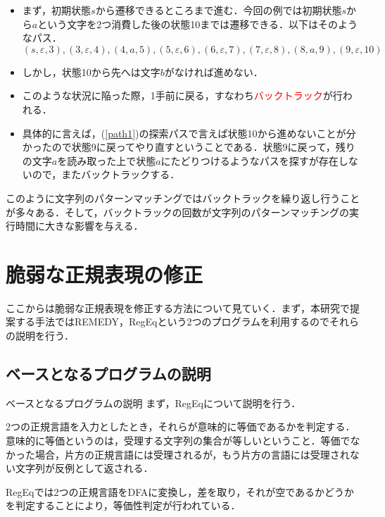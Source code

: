 \documentclass[uplatex,dvipdfmx,11pt,notheorems,aspectratio = 169]{beamer}
\theoremstyle{definition}
\begin{document}
\begin{frame}
  \begin{itemize}
    \item まず，初期状態$s$から遷移できるところまで進む．今回の例では初期状態$s$から$a$という文字を2つ消費した後の状態10までは遷移できる．以下はそのようなパス．
    \begin{equation}
      (s,\varepsilon,3),(3,\varepsilon,4),(4,a,5),(5,\varepsilon,6),(6,\varepsilon,7),(7,\varepsilon,8),(8,a,9),(9,\varepsilon,10)\label{path1}
    \end{equation}
    \item しかし，状態10から先へは文字$b$がなければ進めない．
    \item このような状況に陥った際，1手前に戻る，すなわち\textcolor{red}{バックトラック}が行われる．
    \item 具体的に言えば，(\ref{path1})の探索パスで言えば状態10から進めないことが分かったので状態9に戻ってやり直すということである．状態9に戻って，残りの文字$a$を読み取った上で状態$a$にたどりつけるようなパスを探すが存在しないので，またバックトラックする．
  \end{itemize}
\end{frame}

\begin{frame}
  このように文字列のパターンマッチングではバックトラックを繰り返し行うことが多々ある．そして，バックトラックの回数が文字列のパターンマッチングの実行時間に大きな影響を与える．
\end{frame}


\section{脆弱な正規表現の修正}
\begin{frame}
  ここからは脆弱な正規表現を修正する方法について見ていく．まず，本研究で提案する手法ではREMEDY，RegEqという2つのプログラムを利用するのでそれらの説明を行う．
\end{frame}



\subsection{ベースとなるプログラムの説明}
\begin{frame}{ベースとなるプログラムの説明}
まず，RegEq\cite{regeq}について説明を行う．\vspace{0.2in}

2つの正規言語を入力としたとき，それらが意味的に等価であるかを判定する．意味的に等価というのは，受理する文字列の集合が等しいということ．等価でなかった場合，片方の正規言語には受理されるが，もう片方の言語には受理されない文字列が反例として返される．\vspace{0.2in}

RegEqでは2つの正規言語をDFAに変換し，差を取り，それが空であるかどうかを判定することにより，等価性判定が行われている．
\end{frame}
\end{document}
